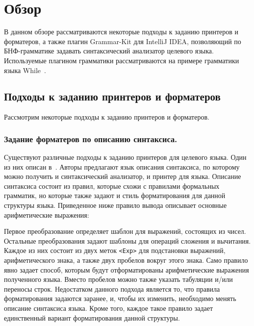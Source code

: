 \section{Обзор}
\lstset{basicstyle=\normalsize\ttfamily, columns=fullflexible}
В данном обзоре рассматриваются некоторые подходы к заданию принтеров и форматеров, а также плагин Grammar-Kit для IntelliJ IDEA, позволяющий по БНФ-грамматике задавать синтаксический анализатор целевого языка.
Используемые плагином грамматики рассматриваются на примере грамматики языка While~\cite{paper:nielson}.

\subsection{Подходы к заданию принтеров и форматеров}
Рассмотрим некоторые подходы к заданию принтеров и форматеров.
\subsubsection{Задание форматеров по описанию синтаксиса.}%
Существуют различные подходы к заданию принтеров для целевого языка.
Один из них описан в~\cite{paper:tbe}.
Авторы предлагают язык описания синтаксиса, по которому можно получить и синтаксический анализатор, и принтер для языка.
Описание синтаксиса состоит из правил, которые схожи с правилами формальных грамматик, но которые также задают и стиль форматирования для данной структуры языка.
Приведенное ниже правило вывода описывает основные арифметические выражения:
{
    
}
\noindent
Первое преобразование определяет шаблон для выражений, состоящих из чисел.
Остальные преобразования задают шаблоны для операций сложения и вычитания.
Каждое из них состоит из двух меток \lstinline{<Exp>} для подстановки выражений, арифметического знака, а также двух пробелов вокруг этого знака.
Само правило явно задает способ, которым будут отформатированы арифметические выражения полученного языка.
Вместо пробелов можно также указать табуляции и/или переносы строк.
Недостатком данного подхода является то, что правила форматирования задаются заранее, и, чтобы их изменить, необходимо менять описание синтаксиса языка.
Кроме того, каждое такое правило задает единственный вариант форматирования данной структуры.

